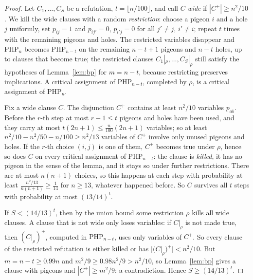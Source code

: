 \begin{proof}
Let $C_1,\dots,C_S$ be a refutation, $t=\lfloor n/100\rfloor$, and call $C$ \emph{wide} if $|C^+|\ge n^2/10$. We kill the wide clauses with a random \emph{restriction}: choose a pigeon $i$ and a hole $j$ uniformly, set $p_{ij}=1$ and $p_{ij'}=0$, $p_{i'j}=0$ for all $j'\ne j$, $i'\ne i$; repeat $t$ times with the remaining pigeons and holes. The restricted variables disappear and $\mathrm{PHP}_n$ becomes $\mathrm{PHP}_{n-t}$ on the remaining $n-t+1$ pigeons and $n-t$ holes, up to clauses that become true; the restricted clauses $C_1|_\rho,\dots,C_S|_\rho$ still satisfy the hypotheses of Lemma~\ref{lem:bp} for $m=n-t$, because restricting preserves implications. A critical assignment of $\mathrm{PHP}_{n-t}$, completed by $\rho$, is a critical assignment of $\mathrm{PHP}_n$.

Fix a wide clause $C$. The disjunction $C^+$ contains at least $n^2/10$ variables $p_{ab}$. Before the $r$-th step at most $r-1\le t$ pigeons and holes have been used, and they carry at most $t(2n+1)\le\frac{n}{100}(2n+1)$ variables; so at least $n^2/10-n^2/50-n/100\ge n^2/13$ variables of $C^+$ involve only unused pigeons and holes. If the $r$-th choice $(i,j)$ is one of them, $C^+$ becomes true under $\rho$, hence so does $C$ on every critical assignment of $\mathrm{PHP}_{n-t}$: the clause is \emph{killed}, it has no pigeon in the sense of the lemma, and it stays so under further restrictions. There are at most $n(n+1)$ choices, so this happens at each step with probability at least $\frac{n^2/13}{n(n+1)}\ge\frac1{14}$ for $n\ge13$, whatever happened before. So $C$ survives all $t$ steps with probability at most $(13/14)^t$.

If $S<(14/13)^t$, then by the union bound some restriction $\rho$ kills all wide clauses. A clause that is not wide only loses variables: if $C|_\rho$ is not made true, then $(C|_\rho)^+$, computed in $\mathrm{PHP}_{n-t}$, uses only variables of $C^+$. So every clause of the restricted refutation is either killed or has $|(C|_\rho)^+|<n^2/10$. But $m=n-t\ge0.99n$ and $m^2/9\ge0.98n^2/9>n^2/10$, so Lemma~\ref{lem:bp} gives a clause with pigeons and $|C^+|\ge m^2/9$: a contradiction. Hence $S\ge(14/13)^t$.
\end{proof}

